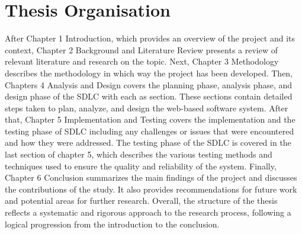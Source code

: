 \section{Thesis Organisation}
\begin{justify}
After Chapter 1 Introduction, which provides an overview of the project and its context, Chapter 2 Background and Literature Review presents a review of relevant literature and research on the topic. Next, Chapter 3 Methodology describes the methodology in which way the project has been developed.
\vspace{0.25cm}
\newendline Then, Chapters 4 Analysis and Design covers the planning phase, analysis phase, and design phase of the SDLC with each as section. These sections contain detailed steps taken to plan, analyze, and design the web-based software system. After that, Chapter 5 Implementation and Testing covers the implementation and the testing phase of SDLC including any challenges or issues that were encountered and how they were addressed. The testing phase of the SDLC is covered in the last section of chapter 5, which describes the various testing methods and techniques used to ensure the quality and reliability of the system.
\vspace{0.25cm}
\newendline Finally, Chapter 6 Conclusion summarizes the main findings of the project and discusses the contributions of the study. It also provides recommendations for future work and potential areas for further research. Overall, the structure of the thesis reflects a systematic and rigorous approach to the research process, following a logical progression from the introduction to the conclusion.
\end{justify}

\clearpage
